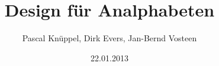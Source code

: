 \documentclass{beamer}
\begin{document}
    \author{Pascal Knüppel, Dirk Evers, Jan-Bernd Vosteen}
    \title{Design für Analphabeten}
    \date{22.01.2013}
    
    \frame{\titlepage}
    

	







\end{document}
